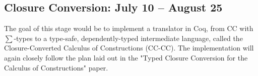 \documentclass[manuscript]{acmart}
\begin{document}
\subsection{Closure Conversion: July 10 -- August 25}
The goal of this stage would be to implement a translator in Coq, from CC with $\sum$-types to a type-safe, dependently-typed intermediate language, called the Closure-Converted Calculus of Constructions (CC-CC). The implementation will again closely follow the plan laid out in the "Typed Closure Conversion for the Calculus of Constructions" paper. 



\end{document}
